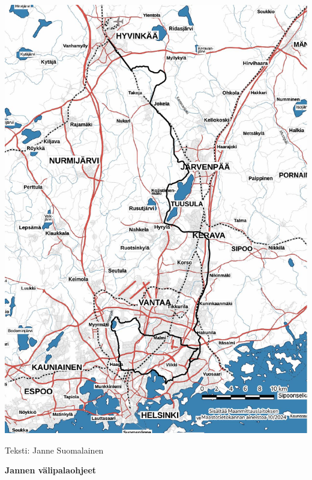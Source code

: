 \begin{multicols}{2}
\vspace*{.25cm}

\begin{Figure}
\noindent\includegraphics[width=\linewidth,trim={5.75cm 0 .75cm 0},clip]{assets/mustaliljareitti.jpg}
\end{Figure}

\vspace*{.5cm}

{\raggedleft Teksti: Janne Suomalainen\par}
\end{multicols}


\clearpage
\vspace*{-1.55cm}
\large\textbf{Jannen välipalaohjeet}

